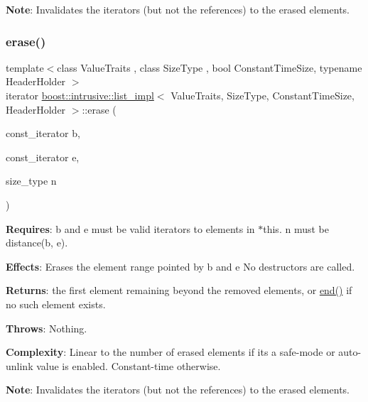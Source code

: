 {\bfseries Note}\+: Invalidates the iterators (but not the references) to the erased elements. \mbox{\label{classboost_1_1intrusive_1_1list__impl_a8811c0530715a891ecd912674b54eb6c}} 
\subsubsection{\texorpdfstring{erase()}{erase()}\hspace{0.1cm}{\footnotesize\ttfamily [3/3]}}
{\footnotesize\ttfamily template$<$class Value\+Traits , class Size\+Type , bool Constant\+Time\+Size, typename Header\+Holder $>$ \\
iterator \hyperlink{classboost_1_1intrusive_1_1list__impl}{boost\+::intrusive\+::list\+\_\+impl}$<$ Value\+Traits, Size\+Type, Constant\+Time\+Size, Header\+Holder $>$\+::erase (\begin{DoxyParamCaption}\item[{const\+\_\+iterator}]{b,  }\item[{const\+\_\+iterator}]{e,  }\item[{size\+\_\+type}]{n }\end{DoxyParamCaption})\hspace{0.3cm}{\ttfamily [inline]}}

{\bfseries Requires}\+: b and e must be valid iterators to elements in $\ast$this. n must be distance(b, e).

{\bfseries Effects}\+: Erases the element range pointed by b and e No destructors are called.

{\bfseries Returns}\+: the first element remaining beyond the removed elements, or \hyperlink{classboost_1_1intrusive_1_1list__impl_af2a454471fced6d4b2fb899c50bbee67}{end()} if no such element exists.

{\bfseries Throws}\+: Nothing.

{\bfseries Complexity}\+: Linear to the number of erased elements if it\textquotesingle{}s a safe-\/mode or auto-\/unlink value is enabled. Constant-\/time otherwise.

{\bfseries Note}\+: Invalidates the iterators (but not the references) to the erased elements. \mbox{\label{classboost_1_1intrusive_1_1list__impl_a53330d72d48a69f95f337752b609f060}} 
